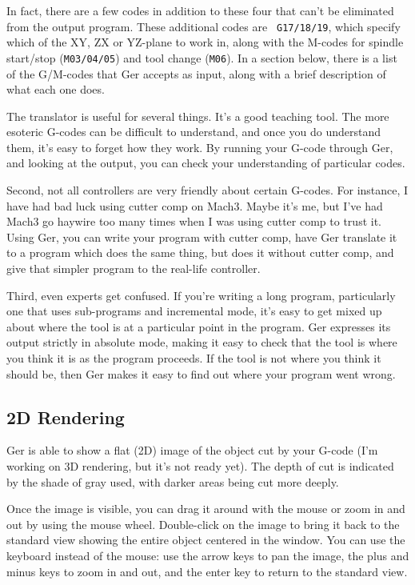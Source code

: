 \documentclass[titlepage,oneside,10pt]{article}
\begin{document}
In fact, there are a few codes in addition to these four that can't
be eliminated from the output program. These additional codes are {\tt
  G17/18/19}, which specify which of the XY, ZX or YZ-plane to work
in, along with the M-codes for spindle start/stop ({\tt M03/04/05}) and
tool change ({\tt M06}). In a section below, there is a list of the
G/M-codes that Ger accepts as input, along with a brief description of
what each one does. 

The translator is useful for several things. It's a good
teaching tool. The more esoteric G-codes can be difficult to
understand, and once you do understand them, it's easy to forget how they
work. By running your G-code through Ger, and looking at the output,
you can check your understanding of particular codes. 

Second, not all controllers are very friendly about certain
G-codes. For instance, I have had bad luck using cutter comp on Mach3.
Maybe it's me, but I've had Mach3 go haywire too many times
when I was using cutter comp to trust it. Using Ger, you can write
your program with cutter comp, have Ger translate it to a program
which does the same thing, but does it without cutter comp, and give
that simpler program to the real-life controller.

Third, even experts get confused. If you're writing a long program,
particularly one that uses sub-programs and incremental mode, it's
easy to get mixed up about where the tool is at a particular point in
the program. Ger expresses its output strictly in absolute mode,
making it easy to check that the tool is where you think it is as the
program proceeds. If the tool is not where you think it should be, then Ger
makes it easy to find out where your program went wrong.

\subsection{2D Rendering}

Ger is able to show a flat (2D) image of the object cut by your
G-code (I'm working on 3D rendering, but it's not ready
yet). The depth of cut is indicated by the shade of gray used, with
darker areas being cut more deeply. 

Once the image is visible, you can drag it around with the mouse or
zoom in and out by using the mouse wheel. Double-click on the
image to bring it back to the standard view showing the entire object
centered in the window. You can use the keyboard instead of the mouse:
use the arrow keys to pan the image, the plus and minus keys to 
zoom in and out, and the enter key to return to the standard view.
\end{document}
